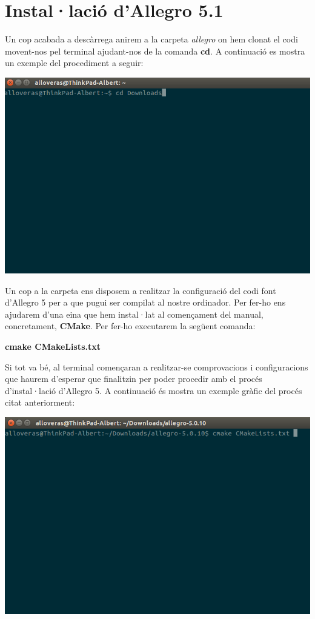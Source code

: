 \documentclass[11pt]{article}
\begin{document}
\section{Instal·lació d'Allegro 5.1}
\noindent Un cop acabada a descàrrega anirem a la carpeta \textit{allegro} on hem clonat el codi movent-nos pel terminal ajudant-nos de la comanda \textbf{cd}. A continuació es mostra un exemple del procediment a seguir:

\begin{center}
	\includegraphics[scale=0.4]{img/Download_Folder_Move.png}
\end{center}

\noindent Un cop a la carpeta ens disposem a realitzar la configuració del codi font d'Allegro 5 per a que pugui ser compilat al nostre ordinador. Per fer-ho ens ajudarem d'una eina que hem instal·lat al començament del manual, concretament, \textbf{CMake}. Per fer-ho executarem la següent comanda:

\begin{center}
	\textbf{cmake CMakeLists.txt}
\end{center}

\newpage

\noindent Si tot va bé, al terminal començaran a realitzar-se comprovacions i configuracions que haurem d'esperar que finalitzin per poder procedir amb el procés d'instal·lació d'Allegro 5. A continuació és mostra un exemple gràfic del procés citat anteriorment:

\begin{center}
	\includegraphics[scale=0.4]{img/CMake_CMakeLists.png}
\end{center}
\end{document}
